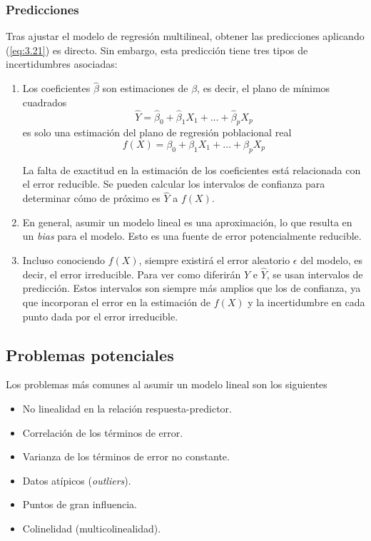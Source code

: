 \subsubsection{Predicciones}

Tras ajustar el modelo de regresión multilineal, obtener las predicciones aplicando (\ref{eq:3.21}) es directo. Sin embargo, esta predicción tiene tres tipos de incertidumbres asociadas:
\begin{enumerate}
\item Los coeficientes $\hat{\beta}$ son estimaciones de $\beta$, es decir, el plano de mínimos cuadrados 
\begin{equation}
\hat{Y} = \hat{\beta}_0 + \hat{\beta}_1 X_1 + \dots + \hat{\beta}_p X_p 
\end{equation}
es solo una estimación del plano de regresión poblacional real
\begin{equation}
f(X) = \beta_0 + \beta_1 X_1 + \dots + \beta_p X_p 
\end{equation}

La falta de exactitud en la estimación de los coeficientes está relacionada con el error reducible. Se pueden calcular los intervalos de confianza para determinar cómo de próximo es $\hat{Y}$ a $f(X)$.
\item En general, asumir un modelo lineal es una aproximación, lo que resulta en un \textit{bias} para el modelo. Esto es una fuente de error potencialmente reducible. 
\item Incluso conociendo $f(X)$, siempre existirá el error aleatorio $\epsilon$ del modelo, es decir, el error irreducible. Para ver como diferirán $Y$ e $\hat{Y}$, se usan intervalos de predicción. Estos intervalos son siempre más amplios que los de confianza, ya que incorporan el error en la estimación de $f(X)$ y la incertidumbre en cada punto dada por el error irreducible.
\end{enumerate}

\subsection{Problemas potenciales}

\noindent Los problemas más comunes al asumir un modelo lineal son los siguientes 
\begin{itemize}
\item No linealidad en la relación respuesta-predictor.
\item Correlación de los términos de error.
\item Varianza de los términos de error no constante.
\item Datos atípicos (\textit{outliers}).
\item Puntos de gran influencia.
\item Colinelidad (multicolinealidad).
\end{itemize}

